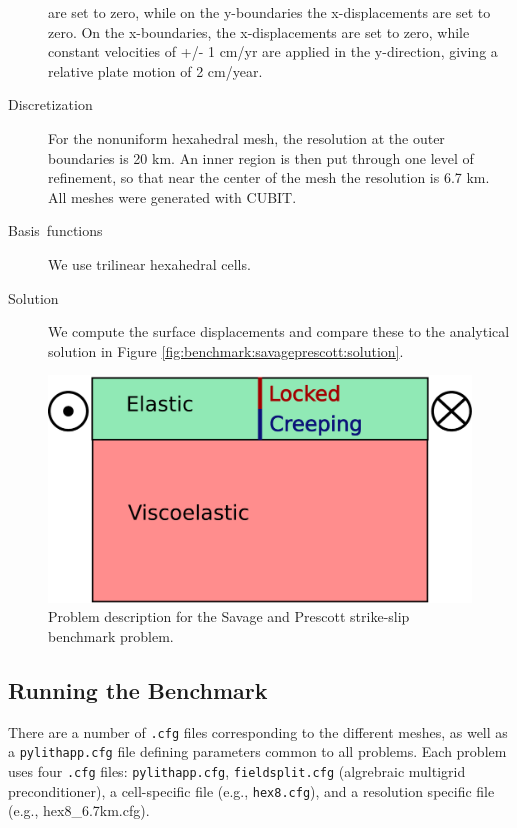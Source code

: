 \begin{description}
are set to zero, while on the y-boundaries the x-displacements are
set to zero. On the x-boundaries, the x-displacements are set to zero,
while constant velocities of +/- 1 cm/yr are applied in the y-direction,
giving a relative plate motion of 2 cm/year.
\item [Discretization] For the nonuniform hexahedral mesh, the resolution
at the outer boundaries is 20 km. An inner region is then put through
one level of refinement, so that near the center of the mesh the resolution
is 6.7 km. All meshes were generated with CUBIT.
\item [Basis~functions] We use trilinear hexahedral cells.
\item [Solution] We compute the surface displacements and compare these
to the analytical solution in Figure \vref{fig:benchmark:savageprescott:solution}.
\end{description}

\begin{figure}[htbp]
  \includegraphics[scale=0.33]{benchmarks/figs/savageprescott_diagram}
  \caption{Problem description for the Savage and Prescott strike-slip
    benchmark problem.}
  \label{fig:benchmark:savageprescott:geometry}
\end{figure}


\subsection{Running the Benchmark}

There are a number of {\tt .cfg} files corresponding to the
different meshes, as well as a {\tt pylithapp.cfg} file defining
parameters common to all problems. Each problem uses four
{\tt .cfg} files: {\tt pylithapp.cfg}, {\tt fieldsplit.cfg}
(algrebraic multigrid preconditioner), a cell-specific file (e.g.,
{\tt hex8.cfg}), and a resolution specific file (e.g.,
hex8\_6.7km.cfg).

